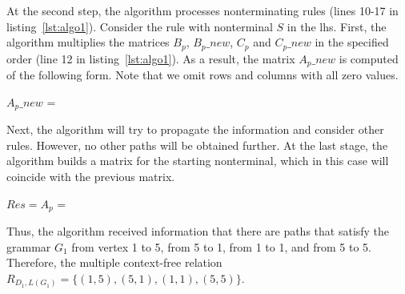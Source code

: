 
At the second step, the algorithm processes nonterminating rules (lines 10-17 in listing~\ref{lst:algo1}). Consider the rule with nonterminal $S$ in the lhs. First, the algorithm multiplies the matrices $B_p$, $B_p\_new$, $C_p$ and $C_p\_new$ in the specified order (line 12 in listing~\ref{lst:algo1}). As a result, the matrix $A_p\_{new}$ is computed of the following form. Note that we omit rows and columns with all zero values.

\begin{center}
    $A_p\_new$ = 


\end{center}

Next, the algorithm will try to propagate the information and consider other rules. However, no other paths will be obtained further. At the last stage, the algorithm builds a matrix for the starting nonterminal, which in this case will coincide with the previous matrix.

\begin{center}
$Res = A_p$ = 
\end{center}                          

Thus, the algorithm received information that there are paths that satisfy the grammar $G_1$ from vertex 1 to 5, from 5 to 1, from 1 to 1, and from 5 to 5. Therefore, the multiple context-free relation $R_{D_1, L(G_1)} = \{(1, 5), (5, 1), (1, 1), (5, 5)\}$.


